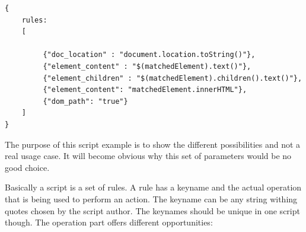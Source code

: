 \begin{verbatim}
{
    rules:
    [

         {"doc_location" : "document.location.toString()"},
         {"element_content" : "$(matchedElement).text()"},
         {"element_children" : "$(matchedElement).children().text()"},
         {"element_content": "matchedElement.innerHTML"},
         {"dom_path": "true"}	
    ]
}
\end{verbatim}

The purpose of this script example is to show the different possibilities and not a real usage case. It will become obvious why this set of parameters would be no good choice. 

Basically a script is a set of rules. A rule has a keyname and the actual operation that is being used to perform an action. The keyname can be any string withing quotes chosen by the script author. The keynames should be unique in one script though. The operation part offers different opportunities:

